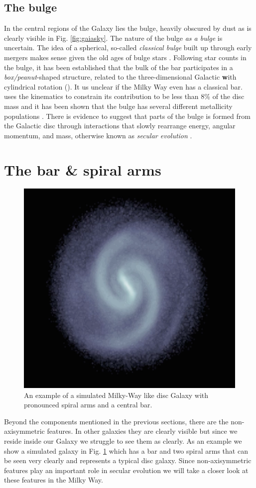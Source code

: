 \subsection{The bulge}\label{subsec:components-bulge}
In the central regions of the Galaxy lies the bulge, heavily obscured by dust as is clearly visible in Fig. \ref{fig:gaiasky}. The nature of the bulge \textit{as a bulge} is uncertain. The idea of a spherical, so-called \textit{classical bulge} built up through early mergers makes sense given the old ages of bulge stars \citep{clarkson:08}. Following star counts in the bulge, it has been established that the bulk of the bar participates in a \textit{box/peanut}-shaped structure, related to the three-dimensional Galactic \textbf with cylindrical rotation (\citealt{wegg:13, ness:13b}). It us unclear if the Milky Way even has a classical bar. \cite{shen:10} uses the kinematics to constrain its contribution to be less than 8\% of the disc mass and it has been shown that the bulge has several different metallicity populations \citep{ness:13a}. There is evidence to suggest that parts of the bulge is formed from the Galactic disc \citep{dimatteo:19} through interactions that slowly rearrange energy, angular momentum, and mass, otherwise known as \textit{secular evolution} \citep{kormendy:13}.

\section{The bar \& spiral arms}\label{sec:barspirals}
\begin{figure}[t]
    \centering
    \includegraphics[width=.65\textwidth]{images/simgal.png}
    \caption{An example of a simulated Milky-Way like disc Galaxy with pronounced spiral arms and a central bar.} %
    \label{fig:simgal}
\end{figure}
Beyond the components mentioned in the previous sections, there are the non-axisymmetric features. In other galaxies they are clearly visible but since we reside inside our Galaxy we struggle to see them as clearly. As an example we show a simulated galaxy in Fig. \ref{fig:simgal} which has a bar and two spiral arms that can be seen very clearly and represents a typical disc galaxy. Since non-axisymmetric features play an important role in secular evolution we will take a closer look at these features in the Milky Way.

